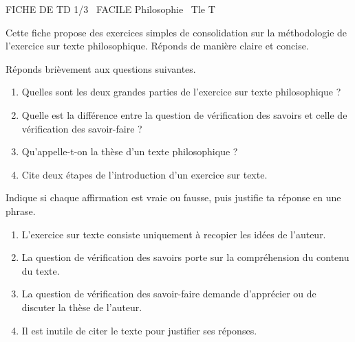 \documentclass[11pt]{article}
\begin{document}
\begin{tcolorbox}[enhanced,colback=popink,colframe=popink,arc=10pt,boxrule=0pt,left=12pt,right=12pt,top=9pt,bottom=9pt]
{\color{white}\popxbold\small FICHE DE TD 1/3 \textbullet\ FACILE \hfill Philosophie \textbullet\ Tle T\par}
\end{tcolorbox}
\vspace{4pt}
Cette fiche propose des exercices simples de consolidation sur la méthodologie de l'exercice sur texte philosophique. Réponds de manière claire et concise.

\begin{exercice}
Réponds brièvement aux questions suivantes.
\begin{enumerate}
\item Quelles sont les deux grandes parties de l'exercice sur texte philosophique ?
\item Quelle est la différence entre la question de vérification des savoirs et celle de vérification des savoir-faire ?
\item Qu'appelle-t-on la thèse d'un texte philosophique ?
\item Cite deux étapes de l'introduction d'un exercice sur texte.
\end{enumerate}
\end{exercice}

\begin{exercice}
Indique si chaque affirmation est vraie ou fausse, puis justifie ta réponse en une phrase.
\begin{enumerate}
\item L'exercice sur texte consiste uniquement à recopier les idées de l'auteur.
\item La question de vérification des savoirs porte sur la compréhension du contenu du texte.
\item La question de vérification des savoir-faire demande d'apprécier ou de discuter la thèse de l'auteur.
\item Il est inutile de citer le texte pour justifier ses réponses.
\end{enumerate}
\end{exercice}
\end{document}
